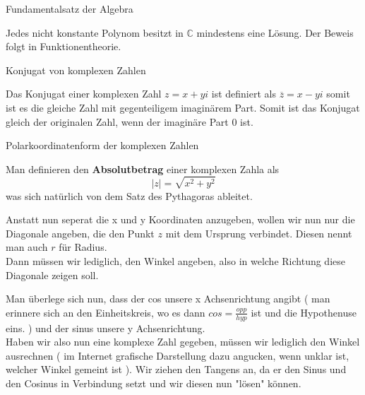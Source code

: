 \documentclass[headsepline,12pt,a4paper]{scrartcl}
\begin{document}
\begin{center}
\item[Fundamentalsatz der Algebra]
\end{center}
\item Jedes nicht konstante Polynom besitzt in $\mathbb{C}$ mindestens eine Lösung. Der Beweis folgt in Funktionentheorie.  \\

\begin{center}
\item[Konjugat von komplexen Zahlen]
\end{center}
\item Das Konjugat einer komplexen Zahl $z = x + yi$ ist definiert als $\overline{z} = x-yi$ somit ist es die gleiche Zahl mit gegenteiligem imaginärem Part. Somit ist das Konjugat gleich der originalen Zahl, wenn der imaginäre Part 0 ist.\\

\newpage

\begin{center}
\item[Polarkoordinatenform der komplexen Zahlen]
\end{center}
\item Man definieren den \textbf{Absolutbetrag} einer komplexen Zahla als 
$$ |z| = \sqrt{x^2+y^2} $$
was sich natürlich von dem Satz des Pythagoras ableitet. \\
\item Anstatt nun seperat die x und y Koordinaten anzugeben, wollen wir nun nur die Diagonale angeben, die den Punkt $z$ mit dem Ursprung verbindet. Diesen nennt man auch $r$ für Radius. \\
Dann müssen wir lediglich, den Winkel angeben, also in welche Richtung diese Diagonale zeigen soll. \\
\item Man überlege sich nun, dass der cos unsere x Achsenrichtung angibt ( man erinnere sich an den Einheitskreis, wo es dann $ cos = \frac{opp}{hyp} $ ist und die Hypothenuse eins. ) und der sinus unsere y Achsenrichtung. \\

Haben wir also nun eine komplexe Zahl gegeben, müssen wir lediglich den Winkel ausrechnen ( im Internet grafische Darstellung dazu angucken, wenn unklar ist, welcher Winkel gemeint ist ). Wir ziehen den Tangens an, da er den Sinus und den Cosinus in Verbindung setzt und wir diesen nun "lösen" können.  \\
\end{document}
